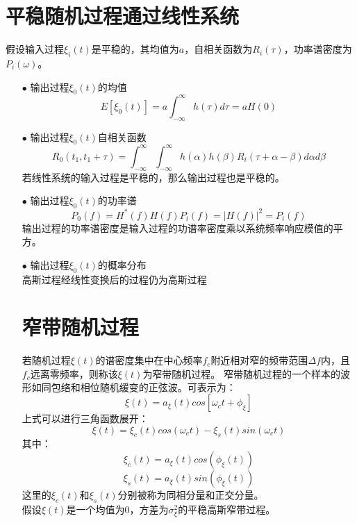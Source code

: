 \documentclass[12pt,a4paper,oneside]{ctexart}
\begin{document}
\section{平稳随机过程通过线性系统}
假设输入过程$\xi_{i}(t)$是平稳的，其均值为$a$，自相关函数为$R_{i}(\tau)$，功率谱密度为$P_{i}(\omega)$。
\begin{itemize}
    \item[$\bullet$] 输出过程$\xi_{0}(t)$的均值
    $$
        E\left[\xi_{0}(t)\right] = a\int_{-\infty}^{\infty}h(\tau)d\tau = aH(0)
    $$
    \item[$\bullet$] 输出过程$\xi_{0}(t)$自相关函数
    $$
        R_{0}(t_{1},t_{1} + \tau) = \int_{-\infty}^{\infty}\int_{-\infty}^{\infty}h(\alpha)h(\beta)R_{i}(\tau + \alpha - \beta)d\alpha d\beta
    $$ 
    若线性系统的输入过程是平稳的，那么输出过程也是平稳的。
    \item[$\bullet$] 输出过程$\xi_{0}(t)$的功率谱
    $$
        P_{0}(f) = H^{*}(f)H(f)P_{i}(f) = |H(f)|^{2} = P_{i}(f)  
    $$
    输出过程的功率谱密度是输入过程的功谱率密度乘以系统频率响应模值的平方。
    \item[$\bullet$] 输出过程$\xi_{0}(t)$的概率分布\\
    高斯过程经线性变换后的过程仍为高斯过程 
\section{窄带随机过程}
若随机过程$\xi(t)$的谱密度集中在中心频率$f_{c}$附近相对窄的频带范围$\Delta f$内，且$f_{c}$远离零频率，则称该$\xi(t)$为窄带随机过程。
窄带随机过程的一个样本的波形如同包络和相位随机缓变的正弦波。可表示为：
$$
    \xi(t) = a_{\xi}(t)cos\left[\omega_{c}t + \phi_{\xi} \right]
$$
上式可以进行三角函数展开：
$$
    \xi(t) = \xi_{c}(t)cos(\omega_{c}t) - \xi_{s}(t)sin(\omega_{c}t)
$$
其中：
$$
    \xi_{c}(t) = a_{\xi}(t)cos(\phi_{\xi}(t))
$$
$$
    \xi_{s}(t) = a_{\xi}(t)sin(\phi_{\xi}(t))
$$
这里的$\xi_{c}(t)$和$\xi_{s}(t)$分别被称为同相分量和正交分量。\\
假设$\xi(t)$是一个均值为0，方差为$\sigma^{2}_{\xi}$的平稳高斯窄带过程。

\end{itemize}
\end{document}
